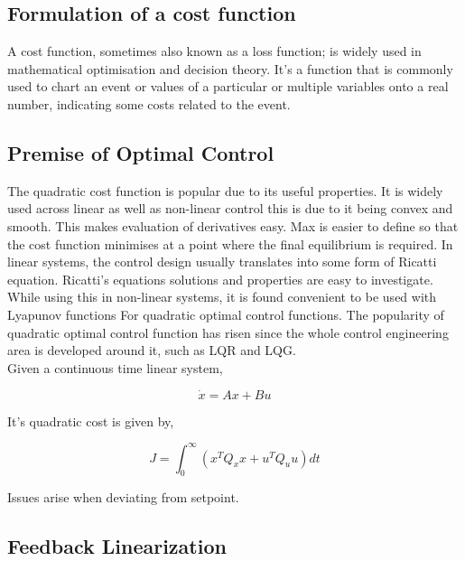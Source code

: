 \documentclass{UoNMCHA}
\numberwithin{equation}{section}
\begin{document}
	
	\subsection*{Formulation of a cost function }
	
	A cost function, sometimes also known as a loss function; is widely used in mathematical optimisation and decision theory. It's a function that is commonly used to chart an event or values of a particular or multiple variables onto a real number, indicating some costs related to the event.
	
	\subsection*{Premise of Optimal Control}
	
	The quadratic cost function is popular due to its useful properties. It is widely used across linear as well as non-linear control this is due to it being convex and smooth. This makes evaluation of derivatives easy. Max is easier to define so that the cost function minimises at a point where the final equilibrium is required. In linear systems, the control design usually translates into some form of Ricatti equation. Ricatti's equations solutions and properties are easy to investigate. While using this in non-linear systems, it is found convenient to be used with Lyapunov functions For quadratic optimal control functions. The popularity of quadratic optimal control function has risen since the whole control engineering area is developed around it, such as LQR and LQG.\\
	
	\newpage
	Given a continuous time linear system,
	
	\begin{equation}
	\dot{x} = Ax + Bu
	\end{equation}
	
	It's quadratic cost is given by,
	
	\begin{equation}
	J=\int_{0}^{\infty}(x^T Q_x x+u^T Q_u u)d t
	\end{equation}
	
	Issues arise when deviating from setpoint.
	
	\subsection*{Feedback Linearization}
	
\end{document}
